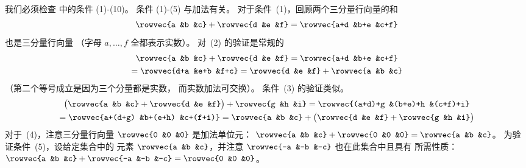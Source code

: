 \begin{exercises}
\begin{answer}
\begin{exparts}
          我们必须检查  中的条件 (1)-(10)。
          条件 (1)-(5) 与加法有关。
          对于条件~(1)，回顾两个三分量行向量的和
          \begin{equation*}
            \rowvec{a  &b  &c}
            +\rowvec{d  &e  &f}
            =\rowvec{a+d  &b+e  &c+f}
          \end{equation*}
          也是三分量行向量
         （字母 $a,\ldots,f$ 全都表示实数）。
         对~(2) 的验证是常规的
          \begin{multline*}
            \rowvec{a  &b  &c}
            +\rowvec{d  &e  &f}
            =\rowvec{a+d  &b+e  &c+f}   \\
            =\rowvec{d+a  &e+b  &f+c}
            =\rowvec{d  &e  &f}
            +\rowvec{a  &b  &c}
          \end{multline*}
          （第二个等号成立是因为三个分量都是实数，
          而实数加法可交换）。
         条件~(3) 的验证类似。
          \begin{multline*}
            \big(\rowvec{a  &b  &c}
              +\rowvec{d  &e  &f}
            \big)
            +\rowvec{g  &h  &i}
            =\rowvec{(a+d)+g  &(b+e)+h  &(c+f)+i}    \\
            =\rowvec{a+(d+g)  &b+(e+h)  &c+(f+i)}
            =\rowvec{a  &b  &c}
            +\big(\rowvec{d  &e  &f}
               +\rowvec{g  &h  &i}
             \big)
          \end{multline*}
          对于~(4)，注意三分量行向量
          $\rowvec{0  &0  &0}$ 是加法单位元：
          $\rowvec{a  &b  &c}+\rowvec{0  &0  &0}=\rowvec{a  &b  &c}$。
          为验证条件~(5)，设给定集合中的
          元素 $\rowvec{a  &b  &c}$，并注意
          $\rowvec{-a  &-b  &-c}$ 也在此集合中且具有
          所需性质：
          $\rowvec{a  &b  &c}+\rowvec{-a  &-b  &-c}=\rowvec{0  &0  &0}$。


\end{exparts}
\end{answer}
\end{exercises}
